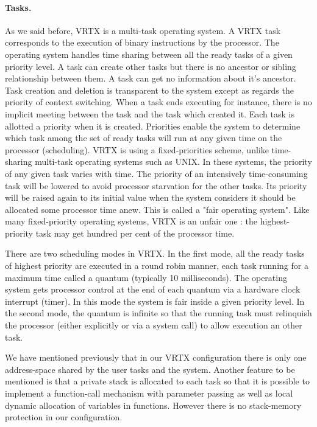 \documentclass[10pt]{report}
\begin{document}
\paragraph{Tasks.} As we said before, VRTX is a multi-task operating system. A VRTX
task corresponds to the execution of binary instructions by the
processor. The operating system handles time sharing between all
the ready tasks of a given priority level. A task can create other tasks
but there is no ancestor or sibling relationship between them. A
task can get no information about it's ancestor. Task creation
and deletion is transparent to the system except as regards the priority  of 
context switching. When a task ends executing for instance, there is no implicit meeting 
between the task and the task which created it.
Each task is allotted a priority when it is created. Priorities enable
the system to determine which task among the set of ready tasks
will run at any given time on the processor (scheduling). VRTX is
using a fixed-priorities scheme, unlike time-sharing multi-task
operating systems such as UNIX. In these systems, the priority of
any given task varies with time. The priority of an intensively time-consuming
task will be lowered to avoid processor starvation for
the other tasks. Its priority will be raised again to its
initial value when the system considers it should be allocated 
some processor time anew. This is called a "fair operating system".
Like many fixed-priority operating systems, VRTX is an unfair
one : the highest-priority task may get hundred per cent of the 
processor time.

There are two scheduling modes in VRTX. In the first mode, all
the ready tasks of highest priority are executed in a round robin
manner, each task running for a maximum time called a quantum
(typically 10 milliseconds). The operating system gets processor
control at the end of each quantum via a hardware clock interrupt
(timer). In this mode the system is fair inside a given priority
level. In the second mode, the quantum is infinite so that the
running task must relinquish the processor (either explicitly or
via a system call) to allow execution an other task.

We have mentioned previously that in our VRTX configuration there
is only one address-space shared by the user tasks and the system. 
Another feature to be mentioned is that a private stack is
allocated to each task so that it is possible to implement a
function-call mechanism with parameter passing as well as local dynamic
allocation of variables in functions. However there is no
stack-memory protection in our configuration.
\end{document}
